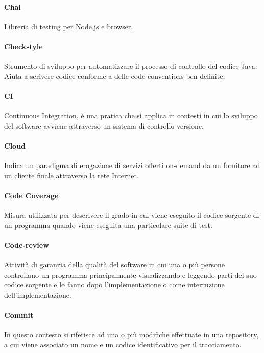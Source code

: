\documentclass[]{article}
\begin{document}
	\paragraph*{Chai}
	Libreria di testing per Node.js e browser.

	\paragraph*{Checkstyle}
	Strumento di sviluppo per automatizzare il processo di controllo del codice Java. Aiuta a scrivere codice conforme a delle code conventions ben definite.

	\paragraph*{CI}
	Continuous Integration, è una pratica che si applica in contesti in cui lo sviluppo del software avviene attraverso un sistema di controllo versione.

	\paragraph*{Cloud}
	Indica un paradigma di erogazione di servizi offerti on-demand da un fornitore ad un cliente finale attraverso la rete Internet.

	\paragraph*{Code Coverage}
	Misura utilizzata per descrivere il grado in cui viene eseguito il codice sorgente di un programma quando viene eseguita una particolare suite di test.

	\paragraph*{Code-review}
	Attività di garanzia della qualità del software in cui una o più persone controllano un programma principalmente visualizzando e leggendo parti del suo codice sorgente e lo fanno dopo l'implementazione o come interruzione dell'implementazione.

	\paragraph*{Commit}
	In questo contesto si riferisce ad una o più modifiche effettuate in una repository, a cui viene associato un nome e un codice identificativo per il tracciamento.
\end{document}
